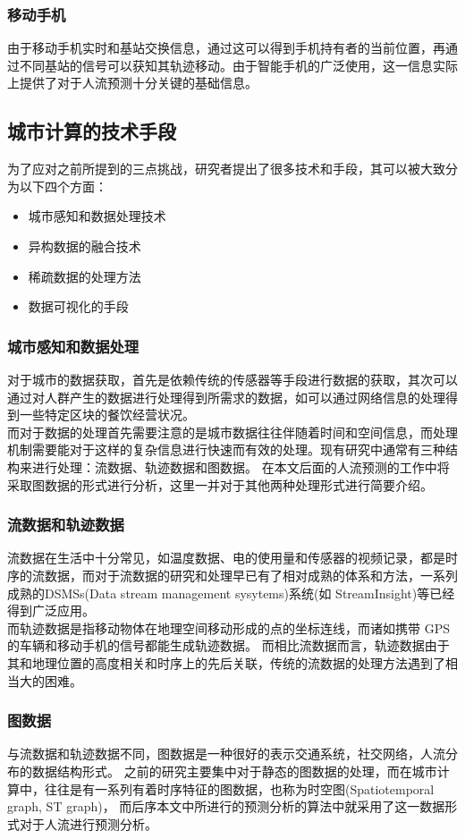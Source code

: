 \subsubsection*{移动手机}
由于移动手机实时和基站交换信息，通过这可以得到手机持有者的当前位置，再通过不同基站的信号可以获知其轨迹移动。由于智能手机的广泛使用，这一信息实际上提供了对于人流预测十分关键的基础信息。
\subsection{城市计算的技术手段}
为了应对之前所提到的三点挑战，研究者提出了很多技术和手段，其可以被大致分为以下四个方面：
\begin{itemize}
	\item 城市感知和数据处理技术
	\item 异构数据的融合技术
	\item 稀疏数据的处理方法
	\item 数据可视化的手段
\end{itemize}
\subsubsection*{城市感知和数据处理}
对于城市的数据获取，首先是依赖传统的传感器等手段进行数据的获取，其次可以通过对人群产生的数据进行处理得到所需求的数据，如可以通过网络信息的处理得到一些特定区块的餐饮经营状况。 \\
\indent 而对于数据的处理首先需要注意的是城市数据往往伴随着时间和空间信息，而处理机制需要能对于这样的复杂信息进行快速而有效的处理。现有研究中通常有三种结构来进行处理：流数据、轨迹数据和图数据。 在本文后面的人流预测的工作中将采取图数据的形式进行分析，这里一并对于其他两种处理形式进行简要介绍。
\subsubsection*{流数据和轨迹数据}
流数据在生活中十分常见，如温度数据、电的使用量和传感器的视频记录，都是时序的流数据，而对于流数据的研究和处理早已有了相对成熟的体系和方法\cite{Aggarwal2006Data}，一系列成熟的DSMSs(Data stream management sysytems)系统(如 StreamInsight)等已经得到广泛应用。\\
\indent 而轨迹数据是指移动物体在地理空间移动形成的点的坐标连线，而诸如携带 GPS 的车辆和移动手机的信号都能生成轨迹数据。 而相比流数据而言，轨迹数据由于其和地理位置的高度相关和时序上的先后关联，传统的流数据的处理方法遇到了相当大的困难\cite{Wang2011Computing}。
\subsubsection*{图数据}
与流数据和轨迹数据不同，图数据是一种很好的表示交通系统，社交网络，人流分布的数据结构形式。 之前的研究主要集中对于静态的图数据的处理\cite{angles2008survey}，而在城市计算中，往往是有一系列有着时序特征的图数据，也称为时空图\cite{hong2015detecting}(Spatiotemporal graph, ST graph)，
而后序本文中所进行的预测分析的算法中就采用了这一数据形式对于人流进行预测分析。

